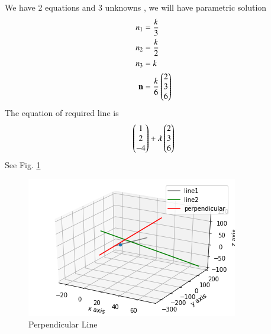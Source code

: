We have 2 equations and 3 unknowns , we will have parametric solution
\begin{align}
 n_1 &=  \frac{k}{3}\\ n_2 &=  \frac{k}{2}\\ n_3 &= k \\
\mathbf{n} &= \frac{k}{6} \begin{pmatrix}2 \\ 3 \\6\end{pmatrix}
\end{align}
The equation of required line is
\begin{align}
	\begin{pmatrix}1\\2\\-4\end{pmatrix} + \lambda\begin{pmatrix}2\\3\\6\end{pmatrix} 
\end{align}
See Fig.     \ref{fig:solutions/line_plane/1091}

\begin{figure}[!htbp]
    \centering
    \includegraphics[width =\columnwidth]{./solutions/line_plane/109/assignment1.png}
    \caption{Perpendicular Line }
    \label{fig:solutions/line_plane/1091}
\end{figure}

